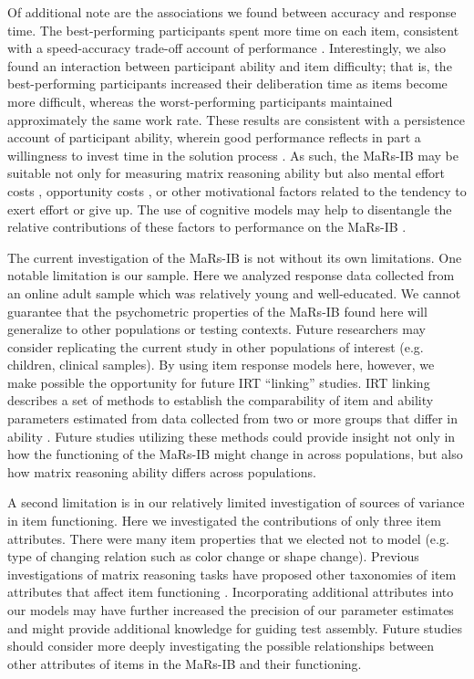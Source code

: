 \documentclass[a4paper,man,natbib]{apa6}
\begin{document}
Of additional note are the associations we found between accuracy and response time. The best-performing participants spent more time on each item, consistent with a speed-accuracy trade-off account of performance \citep{heitz2014speed}. Interestingly, we also found an interaction between participant ability and item difficulty; that is, the best-performing participants increased their deliberation time as items become more difficult, whereas the worst-performing participants maintained approximately the same work rate. These results are consistent with a persistence account of participant ability, wherein good performance reflects in part a willingness to invest time in the solution process \citep{ranger2021effects}. As such, the MaRs-IB may be suitable not only for measuring matrix reasoning ability but also mental effort costs \citep{kool2018mental}, opportunity costs \citep{otto2019opportunity}, or other motivational factors \citep{duckworth2011role} related to the tendency to exert effort or give up. The use of cognitive models may help to disentangle the relative contributions of these factors to performance on the MaRs-IB \citep{ranger2014accumulator}.

The current investigation of the MaRs-IB is not without its own limitations. One notable limitation is our sample. Here we analyzed response data collected from an online adult sample which was relatively young and well-educated. We cannot guarantee that the psychometric properties of the MaRs-IB found here will generalize to other populations or testing contexts. Future researchers may consider replicating the current study in other populations of interest (e.g. children, clinical samples). By using item response models here, however, we make possible the opportunity for future IRT ``linking'' studies. IRT linking describes a set of methods to establish the comparability of item and ability parameters estimated from data collected from two or more groups that differ in ability \citep{lee2018irt}. Future studies utilizing these methods could provide insight not only in how the functioning of the MaRs-IB might change in across populations, but also how matrix reasoning ability differs across populations.

A second limitation is in our relatively limited investigation of sources of variance in item functioning. Here we investigated the contributions of only three item attributes. There were many item properties that we elected not to model (e.g. type of changing relation such as color change or shape change). Previous investigations of matrix reasoning tasks have proposed other taxonomies of item attributes that affect item functioning \citep{carpenter1990one}. Incorporating additional attributes into our models may have further increased the precision of our parameter estimates and might  provide additional knowledge for guiding test assembly. Future studies should consider more deeply investigating the possible relationships between other attributes of items in the MaRs-IB and their functioning. 
\end{document}
